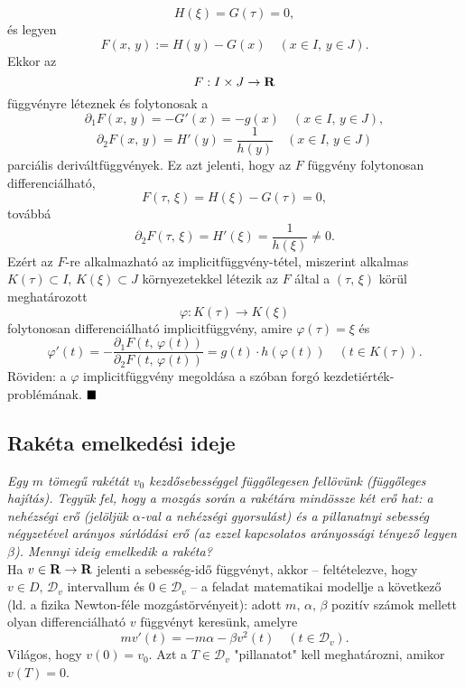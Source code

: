 \[
H(\xi) = G(\tau) = 0,
\]
és legyen
\[
F(x, \, y) := H(y) - G(x) \quad (x \in I, \, y \in J).
\]
Ekkor az
\[
F : I \times J \to \mathbf{R}
\]
függvényre léteznek és folytonosak a
\[
\partial_1 F(x, \, y) = -G'(x) = -g(x) \quad (x \in I, \, y \in J),
\]
\[
\partial_2 F(x, \, y) = H'(y) = \frac{1}{h(y)} \quad (x \in I, \, y \in J)
\]
parciális deriváltfüggvények. Ez azt jelenti, hogy az $F$ függvény folytonosan differenciálható,
\[
F(\tau, \, \xi) = H(\xi) - G(\tau) = 0,
\]
továbbá
\[
\partial_2 F(\tau, \, \xi) = H'(\xi) = \frac{1}{h(\xi)} \neq 0.
\]
Ezért az $F$-re alkalmazható az implicitfüggvény-tétel, miszerint alkalmas $K(\tau) \subset I, \, K(\xi) \subset J$ környezetekkel létezik az $F$ által a $(\tau, \, \xi)$ körül meghatározott
\[
\varphi : K(\tau) \to K(\xi)
\]
folytonosan differenciálható implicitfüggvény, amire $\varphi(\tau) = \xi$ és
\[
\varphi'(t) = -\frac{\partial_1 F(t, \, \varphi(t))}{\partial_2 F(t, \, \varphi(t))} = g(t) \cdot h(\varphi(t)) \quad (t \in K(\tau)).
\]
Röviden: a $\varphi$ implicitfüggvény megoldása a szóban forgó kezdetiérték-problémának.
$\hfill \blacksquare$

\subsection{Rakéta emelkedési ideje}
\textit{Egy $m$ tömegű rakétát $v_0$ kezdősebességgel függőlegesen fellövünk (függőleges hajítás). Tegyük fel, hogy a mozgás során a rakétára mindössze két erő hat: a nehézségi erő (jelöljük $\alpha$-val a nehézségi gyorsulást) és a pillanatnyi sebesség négyzetével arányos súrlódási erő (az ezzel kapcsolatos arányossági tényező legyen $\beta$). Mennyi ideig emelkedik a rakéta?}\\

Ha $v \in \mathbf{R} \to \mathbf{R}$ jelenti a sebesség-idő függvényt, akkor -- feltételezve, hogy $v \in D, \, \mathcal{D}_v$ intervallum és $0 \in \mathcal{D}_v$ -- a feladat matematikai modellje a következő (ld. a fizika Newton-féle mozgástörvényeit): adott $m, \, \alpha, \, \beta$ pozitív számok mellett olyan differenciálható $v$ függvényt keresünk, amelyre
\[
	mv'(t) = -m\alpha - \beta v^2(t) \quad (t \in \mathcal{D}_v).
\]
Világos, hogy $v(0) = v_0$. Azt a $T \in \mathcal{D}_v$ "pillanatot" kell meghatározni, amikor $v(T) = 0$.

